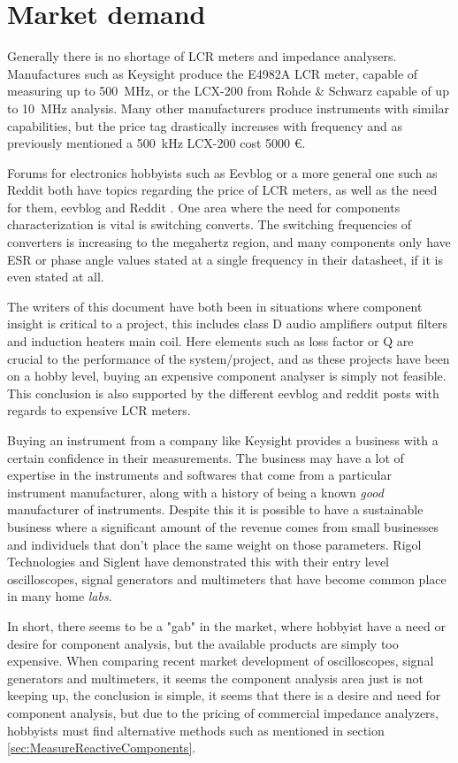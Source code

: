 \section{Market demand} \label{sec:ProfessionalMarketDemand}
Generally there is no shortage of LCR meters and impedance analysers. Manufactures such as Keysight produce the E4982A LCR meter,
 capable of measuring up to \SI{500}{\mega\hertz}, or the LCX-200 from Rohde \& Schwarz capable of up to \SI{10}{\mega\hertz}
analysis. Many other manufacturers produce instruments with similar capabilities, but the price tag drastically increases with frequency
and as previously mentioned a \SI{500}{\kilo\hertz} LCX-200 cost 5000 €. 

Forums for electronics hobbyists such as Eevblog or a more general one such as Reddit both have topics regarding the price of LCR
meters, as well as the need for them, eevblog \cite{EevblogLCR} and Reddit \cite{RedditLCR}. One area where the need for components
characterization is vital is switching converts. The switching frequencies of converters is increasing to the megahertz region, and 
many components only have ESR or phase angle values stated at a single frequency in their datasheet, if it is even stated at all.

The writers of this document have both been in situations where component insight is critical to a project, this includes class D
audio amplifiers output filters and induction heaters main coil. Here elements such as loss factor or Q are crucial to the performance
of the system/project, and as these projects have been on a hobby level, buying an expensive component analyser is simply not feasible.
This conclusion is also supported by the different eevblog and reddit posts with regards to expensive LCR meters.

Buying an instrument from a company like Keysight provides a business with a certain confidence in their measurements. The business may have a lot of expertise in the instruments and softwares that come from a particular instrument manufacturer, along with a history of being a known \textit{good} manufacturer of instruments. Despite this it is possible to have a sustainable business where a significant amount of the revenue comes from small businesses and individuels that don't place the same weight on those parameters. Rigol Technologies and Siglent have demonstrated this with their entry level oscilloscopes, signal generators and multimeters that have become common place in many home \textit{labs}. 

In short, there seems to be a "gab" in the market, where hobbyist have a need or desire for component analysis, but the available
products are simply too expensive. When comparing recent market development of oscilloscopes, signal generators and multimeters,
it seems the component analysis area just is not keeping up, the conclusion is simple, it seems that there is a desire and need for component analysis, but due to the pricing of commercial 
impedance analyzers, hobbyists must find alternative methods such as mentioned in section \ref*{sec:MeasureReactiveComponents}. 